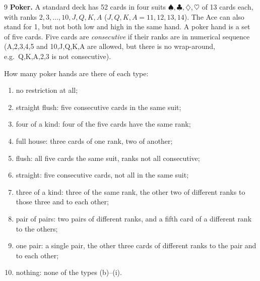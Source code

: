 \begin{exercise}{9}
    \textbf{Poker.} A standard deck has 52 cards in four suits
    $\spadesuit,\clubsuit,\diamondsuit,\heartsuit$ of 13 cards each, with ranks
    $2,3,\dots,10,J,Q,K,A$ ($J,Q,K,A=11,12,13,14$). The Ace can also stand for 1,
    but not both low and high in the same hand. A poker hand is a set of five
    cards. Five cards are \emph{consecutive} if their ranks are in numerical
    sequence (A,2,3,4,5 and 10,J,Q,K,A are allowed, but there is no wrap-around,
    e.g.\ Q,K,A,2,3 is not consecutive).

    How many poker hands are there of each type:
    \begin{enumerate}[label=(\alph*)]
        \item no restriction at all;
        \item straight flush: five consecutive cards in the same suit;
        \item four of a kind: four of the five cards have the same rank;
        \item full house: three cards of one rank, two of another;
        \item flush: all five cards the same suit, ranks not all consecutive;
        \item straight: five consecutive cards, not all in the same suit;
        \item three of a kind: three of the same rank, the other two of
              different ranks to those three and to each other;
        \item pair of pairs: two pairs of different ranks, and a fifth card of a
              different rank to the others;
        \item one pair: a single pair, the other three cards of different ranks
              to the pair and to each other;
        \item nothing: none of the types (b)--(i).
    \end{enumerate}
\end{exercise}

